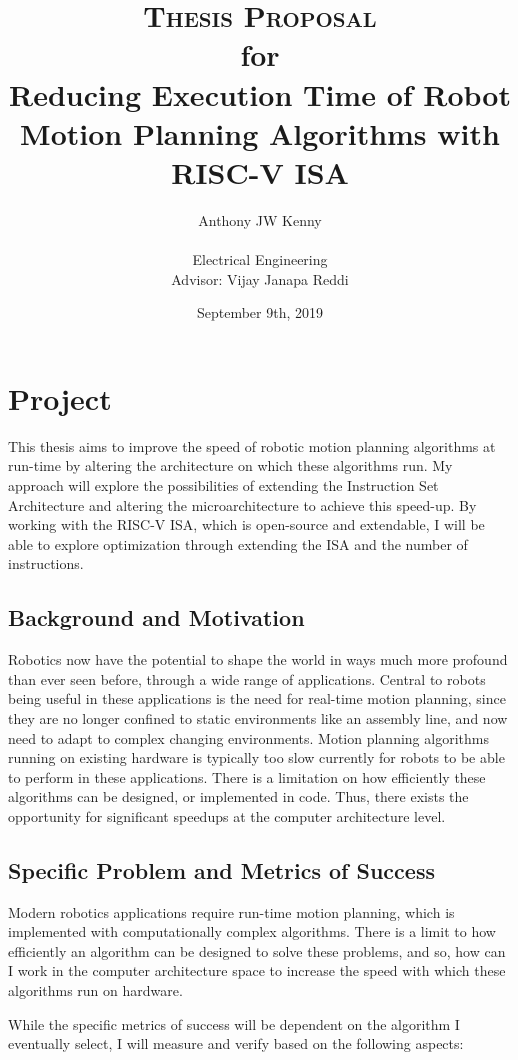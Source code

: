 \documentclass[11pt, oneside]{article}   	%
\title{\textsc{Thesis Proposal} \\ 
	\small{for} \\ 
	\Large{Reducing Execution Time of Robot Motion Planning Algorithms with RISC-V ISA}}
\author{Anthony JW Kenny \\ \\
        Electrical Engineering \\
        Advisor: Vijay Janapa Reddi}
\date{September 9th, 2019}
\begin{document}
\maketitle

\section{Project}
This thesis aims to improve the speed of robotic motion planning algorithms at run-time by altering the architecture on which these algorithms run. My approach will explore the possibilities of extending the Instruction Set Architecture and altering the microarchitecture to achieve this speed-up. By working with the RISC-V ISA, which is open-source and extendable, I will be able to explore optimization through extending the ISA and the number of instructions.

\subsection{Background and Motivation}
Robotics now have the potential to shape the world in ways much more profound than ever seen before, through a wide range of applications. Central to robots being useful in these applications is the need for real-time motion planning, since they are no longer confined to static environments like an assembly line, and now need to adapt to complex changing environments. Motion planning algorithms running on existing hardware is typically too slow currently for robots to be able to perform in these applications. There is a limitation on how efficiently these algorithms can be designed, or implemented in code. Thus, there exists the opportunity for significant speedups at the computer architecture level. 

\subsection{Specific Problem and Metrics of Success}
Modern robotics applications require run-time motion planning, which is implemented with computationally complex algorithms. There is a limit to how efficiently an algorithm can be designed to solve these problems, and so, how can I work in the computer architecture space to increase the speed with which these algorithms run on hardware.

While the specific metrics of success will be dependent on the algorithm I eventually select, I will measure and verify based on the following aspects:
\end{document}
